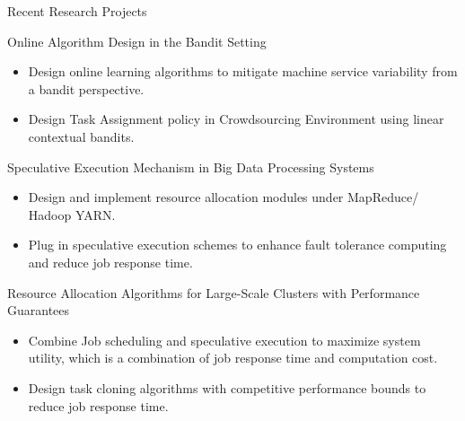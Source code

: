 \documentclass{resume} %
\begin{document}
\begin{rSection}{Recent Research Projects}
\begin{rSubsection}{Online Algorithm Design in the Bandit Setting}{}{}{}
\item[]
\end{rSubsection}
\vspace{-2.5em}
\begin{itemize}
\setlength{\leftmargin}{0em}
    \setlength{\itemsep}{0.2em}
    \setlength{\parskip}{0pt}
\item Design online learning algorithms to mitigate machine service variability from a bandit perspective. 
\item Design Task Assignment policy in Crowdsourcing Environment using linear contextual bandits. 
\end{itemize}

\begin{rSubsection}{Speculative Execution Mechanism in Big Data Processing Systems}{}{}{}
\item[]
\end{rSubsection}
\vspace{-2.5em}
\begin{itemize}
\setlength{\leftmargin}{0em}
    \setlength{\itemsep}{0.2em}
    \setlength{\parskip}{0pt}
\item Design and implement resource allocation modules under MapReduce/ Hadoop YARN. 
\item Plug in speculative execution schemes to enhance fault tolerance computing and reduce job response time. 
\end{itemize}

\begin{rSubsection}{Resource Allocation Algorithms for Large-Scale Clusters with Performance Guarantees}{}{}{}
\item[]
\end{rSubsection}
\vspace{-2.5em}
\begin{itemize}
\setlength{\leftmargin}{0em}
    \setlength{\itemsep}{0.2em}
    \setlength{\parskip}{0pt}
\item Combine Job scheduling and speculative execution to maximize system utility, which is a combination of job response time and computation cost.
\item Design task cloning algorithms with competitive performance bounds to reduce job response time.
\end{itemize}


\end{rSection}
\end{document}
